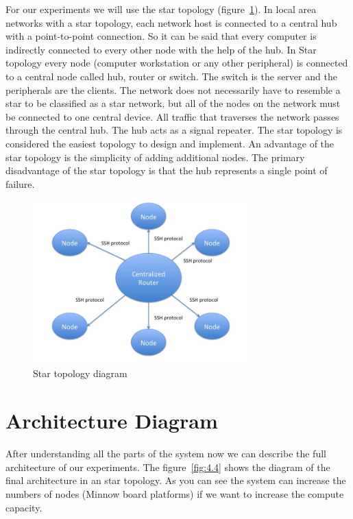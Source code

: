 For our experiments we will use the star topology (figure~\ref{fig:4.3}). In
local area networks with a star topology, each network host is connected to a
central hub with a point-to-point connection. So it can be said that every
computer is indirectly connected to every other node with the help of the hub.
In Star topology every node (computer workstation or any other peripheral) is
connected to a central node called hub, router or switch. The switch is the
server and the peripherals are the clients. The network does not necessarily
have to resemble a star to be classified as a star network, but all of the
nodes on the network must be connected to one central device. All traffic that
traverses the network passes through the central hub. The hub acts as a signal
repeater. The star topology is considered the easiest topology to design and
implement. An advantage of the star topology is the simplicity of adding
additional nodes. The primary disadvantage of the star topology is that the hub
represents a single point of failure.

\begin{figure}[H]
\centering
\includegraphics[width=0.75\textwidth]{images/star_topology.png}
\caption{Star topology diagram}
\label{fig:4.3}
\end{figure}


\section{Architecture Diagram}

After understanding all the parts of the system now we can describe the full
architecture of our experiments. The figure~\ref{fig:4.4} shows the diagram of
the final architecture in an star topology. As you can see the system can
increase the numbers of nodes (Minnow board platforms) if we want to increase
the compute capacity.



